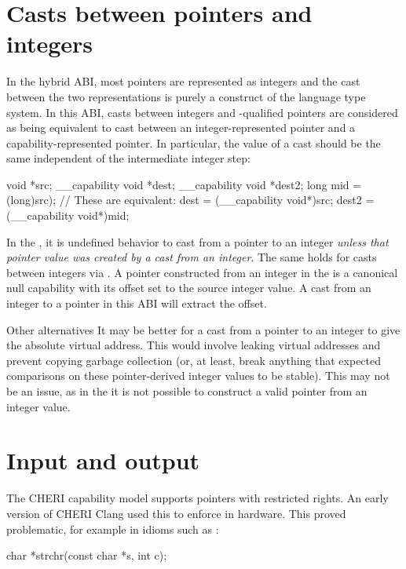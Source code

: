 \section{Casts between pointers and integers}

In the hybrid ABI, most pointers are represented as integers and the cast between the two representations is purely a construct of the language type system.
In this ABI, casts between integers and -qualified pointers are considered as being equivalent to cast between an integer-represented pointer and a capability-represented pointer.
In particular, the value of a cast should be the same independent of the intermediate integer step:
\begin{csnippet}
	void *src;
	__capability void *dest;
	__capability void *dest2;
	long mid = (long)src);
	// These are equivalent:
	dest = (__capability void*)src;
	dest2 = (__capability void*)mid;
\end{csnippet}

In the \sandboxABI, it is undefined behavior to cast from a pointer to an integer \textit{unless that pointer value was created by a cast from an integer}.
The same holds for casts between integers via .
A pointer constructed from an integer in the \sandboxABI{} is a canonical null capability with its offset set to the source integer value.
A cast from an integer to a pointer in this ABI will extract the offset.

\begin{notebox}{Other alternatives}
	It may be better for a cast from a pointer to an integer to give the absolute virtual address.
	This would involve leaking virtual addresses and prevent copying garbage collection (or, at least, break anything that expected comparisons on these pointer-derived integer values to be stable).
	This may not be an issue, as in the \sandboxABI{} it is not possible to construct a valid pointer from an integer value.
\end{notebox}

\section{Input and output}

The CHERI capability model supports pointers with restricted rights.
An early version of CHERI Clang used this to enforce  in hardware.
This proved problematic, for example in idioms such as :

\begin{csnippet}
char *strchr(const char *s, int c);
\end{csnippet}

